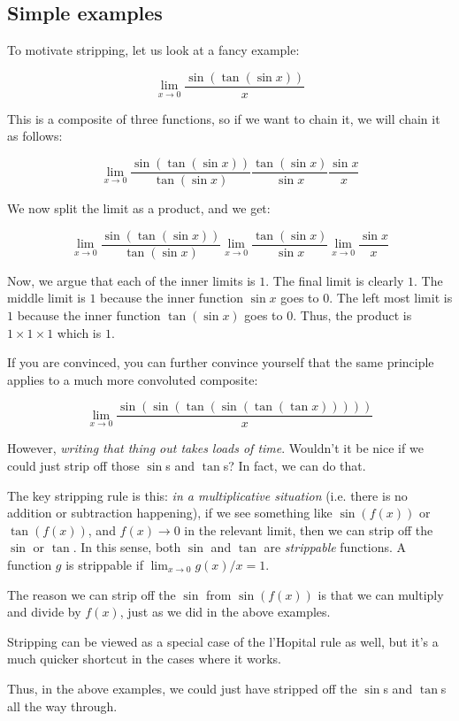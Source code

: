 \documentclass{amsart}
\begin{document}
\subsection{Simple examples}

To motivate stripping, let us look at a fancy example:

$$\lim_{x \to 0} \frac{\sin(\tan(\sin x))}{x}$$

This is a composite of three functions, so if we want to chain it, we
will chain it as follows:

$$\lim_{x \to 0} \frac{\sin(\tan(\sin x))}{\tan(\sin x)}\frac{\tan(\sin x)}{\sin x}\frac{\sin x}{x}$$

We now split the limit as a product, and we get:

$$\lim_{x \to 0} \frac{\sin(\tan(\sin x))}{\tan(\sin x)}\lim_{x \to 0} \frac{\tan(\sin x)}{\sin x}\lim_{x \to 0} \frac{\sin x}{x}$$

Now, we argue that each of the inner limits is $1$. The final limit is
clearly $1$. The middle limit is $1$ because the inner function $\sin
x$ goes to $0$. The left most limit is $1$ because the inner function
$\tan(\sin x)$ goes to $0$. Thus, the product is $1 \times 1 \times 1$
which is $1$.

If you are convinced, you can further convince yourself that the same
principle applies to a much more convoluted composite:

$$\lim_{x \to 0} \frac{\sin(\sin(\tan(\sin(\tan(\tan x)))))}{x}$$

However, {\em writing that thing out takes loads of time}. Wouldn't it
be nice if we could just strip off those $\sin$s and $\tan$s? In fact,
we can do that.

The key stripping rule is this: {\em in a multiplicative situation}
(i.e. there is no addition or subtraction happening), if we see
something like $\sin(f(x))$ or $\tan(f(x))$, and $f(x) \to 0$ in the
relevant limit, then we can strip off the $\sin$ or $\tan$. In this
sense, both $\sin$ and $\tan$ are {\em strippable} functions. A
function $g$ is strippable if $\lim_{x \to 0} g(x)/x = 1$.

The reason we can strip off the $\sin$ from $\sin(f(x))$ is that we
can multiply and divide by $f(x)$, just as we did in the above
examples.

Stripping can be viewed as a special case of the l'Hopital rule as
well, but it's a much quicker shortcut in the cases where it works.

Thus, in the above examples, we could just have stripped off the
$\sin$s and $\tan$s all the way through.
\end{document}
